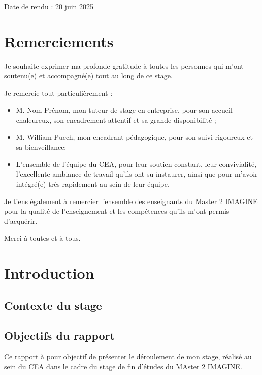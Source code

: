 \documentclass[12pt,a4paper]{report}
\begin{document}
\begin{titlepage}
\begin{center}
\vfill
{\small Date de rendu : 20 juin 2025}

\end{center}
\end{titlepage}

\chapter*{Remerciements}

Je souhaite exprimer ma profonde gratitude à toutes les personnes qui m'ont soutenu(e) et accompagné(e) tout au long de ce stage.

Je remercie tout particulièrement :
\begin{itemize}
  \item M. Nom Prénom, mon tuteur de stage en entreprise, pour son accueil chaleureux, son encadrement attentif et sa grande disponibilité ;
  \item M. William Puech, mon encadrant pédagogique, pour son suivi rigoureux et sa bienveillance;
  \item L’ensemble de l’équipe du CEA, pour leur soutien constant, leur convivialité, l’excellente ambiance de travail qu’ils ont su instaurer, ainsi que pour m’avoir intégré(e) très rapidement au sein de leur équipe.
\end{itemize}

Je tiens également à remercier l’ensemble des enseignants du Master 2 IMAGINE pour la qualité de l’enseignement et les compétences qu’ils m’ont permis d’acquérir.

\vspace{1em}
Merci à toutes et à tous.

\tableofcontents
\pagestyle{fancy}
\newpage

\chapter{Introduction}
\section{Contexte du stage}
\section{Objectifs du rapport}
Ce rapport à pour objectif de présenter le déroulement de mon stage, réalisé au sein du CEA dans le cadre du stage de fin d'études du MAster 2 IMAGINE.
\end{document}
